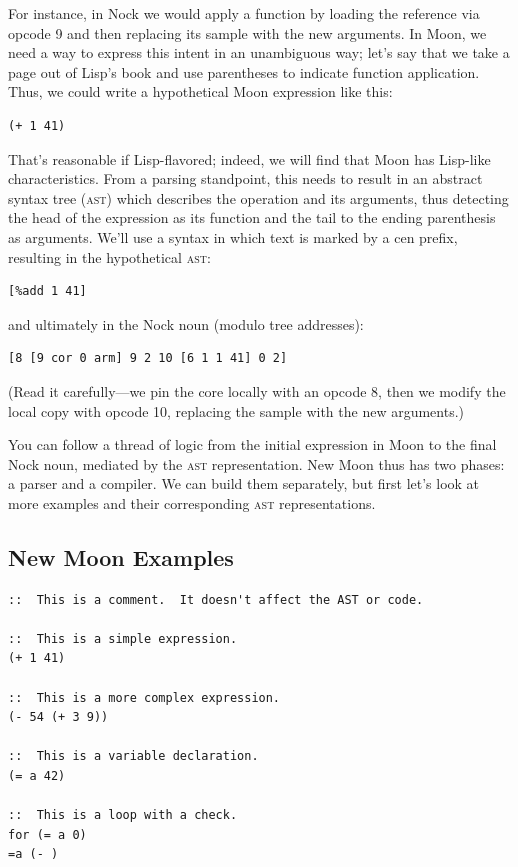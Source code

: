 For instance, in Nock we would apply a function by loading the reference via opcode 9 and then replacing its sample with the new arguments.  In Moon, we need a way to express this intent in an unambiguous way; let's say that we take a page out of Lisp's book and use parentheses to indicate function application.  Thus, we could write a hypothetical Moon expression like this:

\begin{lstlisting}[style=listingcode]
(+ 1 41)
\end{lstlisting}

\noindent
That's reasonable if Lisp-flavored; indeed, we will find that Moon has Lisp-like characteristics.  From a parsing standpoint, this needs to result in an abstract syntax tree (\textsc{ast}) which describes the operation and its arguments, thus detecting the head of the expression as its function and the tail to the ending parenthesis as arguments.  We'll use a syntax in which text is marked by a \textct{\%} cen prefix, resulting in the hypothetical \textsc{ast}:

\begin{lstlisting}[style=listingcode]
[%add 1 41]
\end{lstlisting}

\noindent
and ultimately in the Nock noun (modulo tree addresses):

\begin{lstlisting}[style=listingcode]
[8 [9 cor 0 arm] 9 2 10 [6 1 1 41] 0 2]
\end{lstlisting}

\noindent
(Read it carefully---we pin the core locally with an opcode 8, then we modify the local copy with opcode 10, replacing the sample with the new arguments.)

You can follow a thread of logic from the initial expression in Moon to the final Nock noun, mediated by the \textsc{ast} representation.  New Moon thus has two phases:  a parser and a compiler.  We can build them separately, but first let's look at more examples and their corresponding \textsc{ast} representations.

\subsection{New Moon Examples}

\begin{lstlisting}[style=listingcode]
::  This is a comment.  It doesn't affect the AST or code.

::  This is a simple expression.
(+ 1 41)

::  This is a more complex expression.
(- 54 (+ 3 9))

::  This is a variable declaration.
(= a 42)

::  This is a loop with a check.
for (= a 0)
=a (- )
\end{lstlisting}

